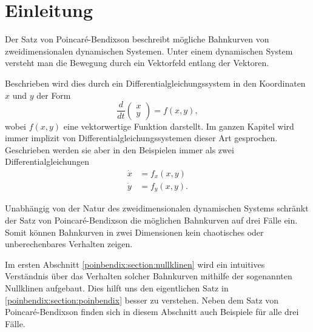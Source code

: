 \section{Einleitung} \label{poinbendix:section:einleitung}

Der Satz von Poincaré-Bendixson beschreibt mögliche Bahnkurven von zweidimensionalen dynamischen Systemen.
Unter einem dynamischen System versteht man die Bewegung durch ein Vektorfeld entlang der Vektoren.

Beschrieben wird dies durch ein Differentialgleichungssystem in den Koordinaten $x$ und $y$ der Form
\begin{equation*}
\frac{d}{dt}
\begin{pmatrix}x\\y\end{pmatrix}
=
f(x,y),
\end{equation*}
wobei $f(x,y)$ eine vektorwertige Funktion darstellt.
Im ganzen Kapitel wird immer implizit von Differentialgleichungssystemen dieser Art gesprochen.
Geschrieben werden sie aber in den Beispielen immer als zwei Differentialgleichungen
\begin{align*}
    \dot{x} &= f_x(x, y) \\
    \dot{y} &= f_y(x, y).
\end{align*}

Unabhängig von der Natur des zweidimensionalen dynamischen Systems schränkt der Satz von Poincaré-Bendixson die möglichen Bahnkurven auf drei Fälle ein.
Somit können Bahnkurven in zwei Dimensionen kein chaotisches oder unberechenbares Verhalten zeigen.

Im ersten Abschnitt \ref{poinbendix:section:nullklinen} wird ein intuitives Verständnis über das Verhalten solcher Bahnkurven mithilfe der sogenannten Nullklinen aufgebaut.
Dies hilft uns den eigentlichen Satz in \ref{poinbendix:section:poinbendix} besser zu verstehen.
Neben dem Satz von Poincaré-Bendixson finden sich in diesem Abschnitt auch Beispiele für alle drei Fälle.

